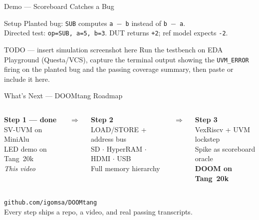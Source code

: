 \documentclass[aspectratio=169]{beamer}
\begin{document}
\begin{frame}{Demo --- Scoreboard Catches a Bug}
  \begin{block}{Setup}
    Planted bug: \texttt{SUB} computes \texttt{a\,$-$\,b} instead of
    \texttt{b\,$-$\,a}.\\
    Directed test: \texttt{op=SUB, a=5, b=3}.
    DUT returns \texttt{+2}; ref model expects \texttt{-2}.
  \end{block}

  \vspace{0.6em}
  \begin{alertblock}{TODO --- insert simulation screenshot here}
    Run the testbench on EDA Playground (Questa/VCS), capture the terminal
    output showing the \texttt{UVM\_ERROR} firing on the planted bug and the
    passing coverage summary, then paste or include it here.
  \end{alertblock}
\end{frame}

\begin{frame}{What's Next --- DOOMtang Roadmap}
  \begin{columns}
      \textbf{\alert{Step 1 --- done}}\\[0.5em]
      \small
      SV-UVM on MiniAlu\\
      LED demo on Tang~20k\\[0.3em]
      \textit{This video}

      \centering\Large$\Rightarrow$

      \textbf{Step 2}\\[0.5em]
      \small
      LOAD/STORE + address bus\\
      SD $\cdot$ HyperRAM $\cdot$ HDMI $\cdot$ USB\\
      Full memory hierarchy

      \centering\Large$\Rightarrow$

      \textbf{Step 3}\\[0.5em]
      \small
      VexRiscv + UVM lockstep\\
      Spike as scoreboard oracle\\[0.3em]
      \textbf{DOOM on Tang~20k}

  \end{columns}

  \vspace{1.2em}
  \centering
  \texttt{github.com/igomsa/DOOMtang}\\[0.3em]
  \small Every step ships a repo, a video, and real passing transcripts.
\end{frame}
\end{document}
